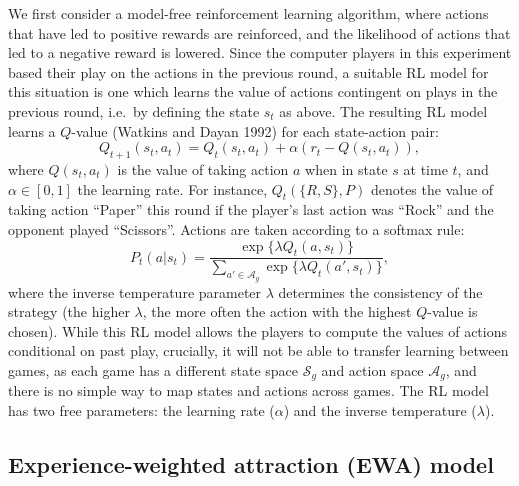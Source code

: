 \documentclass[smallextended]{svjour3}       %
\begin{document}
We first consider a model-free reinforcement learning algorithm, where
actions that have led to positive rewards are reinforced, and the
likelihood of actions that led to a negative reward is lowered. Since
the computer players in this experiment based their play on the actions
in the previous round, a suitable RL model for this situation is one
which learns the value of actions contingent on plays in the previous
round, i.e.~by defining the state \(s_{t}\) as above. The resulting RL
model learns a \(Q\)-value (Watkins and Dayan 1992) for each
state-action pair:
\[Q_{t+1}(s_{t},a_{t}) = Q_{t}(s_{t},a_{t}) + \alpha \left( r_{t}  - Q(s_{t},a_{t}) \right) ,\]
where \(Q(s_{t},a_{t})\) is the value of taking action \(a\) when in
state \(s\) at time \(t\), and \(\alpha \in [0,1]\) the learning rate.
For instance, \(Q_t(\{R,S\},P)\) denotes the value of taking action
``Paper'' this round if the player's last action was ``Rock'' and the
opponent played ``Scissors''. Actions are taken according to a softmax
rule:
\[P_{t}(a|s_t) = \frac{\exp \{ \lambda Q_{t}(a,s_t) \}}{\sum_{a' \in \mathcal{A}_g} \exp \{\lambda  Q_{t}(a',s_t) \}}, \]
where the inverse temperature parameter \(\lambda\) determines the
consistency of the strategy (the higher \(\lambda\), the more often the
action with the highest \(Q\)-value is chosen). While this RL model
allows the players to compute the values of actions conditional on past
play, crucially, it will not be able to transfer learning between games,
as each game has a different state space \(\mathcal{S}_g\) and action
space \(\mathcal{A}_g\), and there is no simple way to map states and
actions across games. The RL model has two free parameters: the learning
rate (\(\alpha\)) and the inverse temperature (\(\lambda\)).

\hypertarget{experience-weighted-attraction-ewa-model}{%
\subsection{Experience-weighted attraction (EWA)
model}\label{experience-weighted-attraction-ewa-model}}
\end{document}

